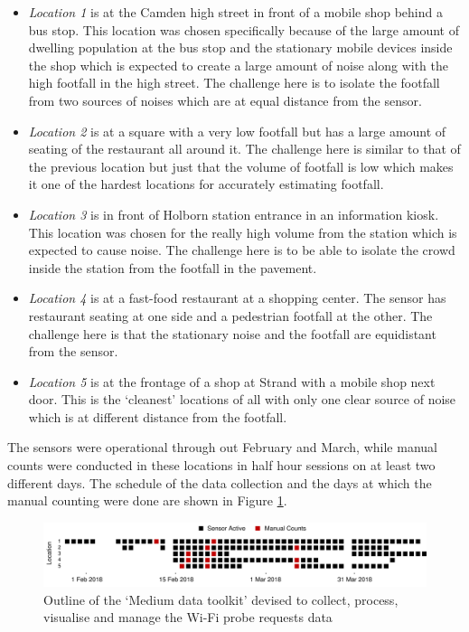 \begin{itemize}[leftmargin=2em, rightmargin=2em]
  \item \textit{Location 1} is at the Camden high street in front of a mobile shop behind a bus stop. This location was chosen specifically because of the large amount of dwelling population at the bus stop and the stationary mobile devices inside the shop which is expected to create a large amount of noise along with the high footfall in the high street. The challenge here is to isolate the footfall from two sources of noises which are at equal distance from the sensor.
  \item \textit{Location 2} is at a square with a very low footfall but has a large amount of seating of the restaurant all around it. The challenge here is similar to that of the previous location but just that the volume of footfall is low which makes it one of the hardest locations for accurately estimating footfall.
  \item \textit{Location 3} is in front of Holborn station entrance in an information kiosk. This location was chosen for the really high volume from the station which is expected to cause noise. The challenge here is to be able to isolate the crowd inside the station from the footfall in the pavement.
  \item \textit{Location 4} is at a fast-food restaurant at a shopping center. The sensor has restaurant seating at one side and a pedestrian footfall at the other. The challenge here is that the stationary noise and the footfall are equidistant from the sensor.
  \item \textit{Location 5} is at the frontage of a shop at Strand with a mobile shop next door. This is the `cleanest' locations of all with only one clear source of noise which is at different distance from the footfall.
\end{itemize}

The sensors were operational through out February and March, while manual counts were conducted in these locations in half hour sessions on at least two different days.
The schedule of the data collection and the days at which the manual counting were done are shown in Figure \ref{figure:collection:pilot:schedule}.

\begin{figure}
  \includegraphics{images/pilot-study-schedule.png}
  \caption{Outline of the `Medium data toolkit' devised to collect, process, visualise and manage the Wi-Fi probe requests data}
  \label{figure:collection:pilot:schedule}
\end{figure}

